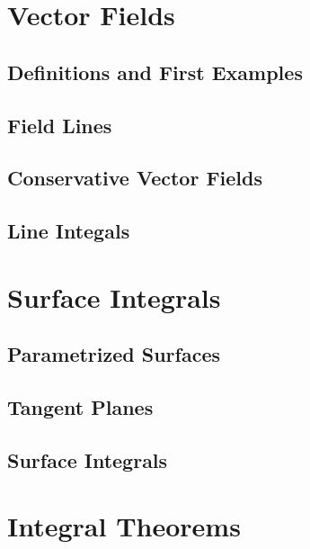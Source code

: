 \documentclass[12pt,letterpaper, openany]{book}
\begin{document}
\chapter{Vector Fields}
\section{Definitions and First Examples}

\section{Field Lines}

\section{Conservative Vector Fields}

\section{Line Integals}


\chapter{Surface Integrals}
\section{Parametrized Surfaces}

\section{Tangent Planes}

\section{Surface Integrals}

%
%

\chapter{Integral Theorems}
\end{document}
